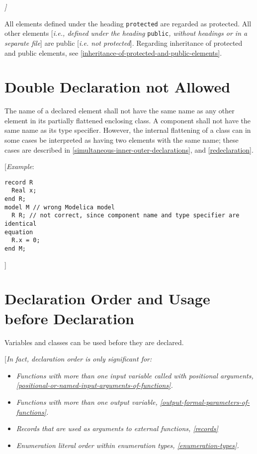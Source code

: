 \emph{{]}}

All elements defined under the heading \lstinline!protected! are regarded as
protected. All other elements {[}\emph{i.e., defined under the heading}
\lstinline!public!\emph{, without headings or in a separate file}{]} are public
{[}\emph{i.e. not protected}{]}. Regarding inheritance of protected and
public elements, see \autoref{inheritance-of-protected-and-public-elements}.

\section{Double Declaration not Allowed}

The name of a declared element shall not have the same name as any other
element in its partially flattened enclosing class. A component shall
not have the same name as its type specifier. However, the internal
flattening of a class can in some cases be interpreted as having two
elements with the same name; these cases are described in \autoref{simultaneous-inner-outer-declarations},
and \autoref{redeclaration}.

{[}\emph{Example}:
\begin{lstlisting}[language=modelica]
record R
  Real x;
end R;
model M // wrong Modelica model
  R R; // not correct, since component name and type specifier are identical
equation
  R.x = 0;
end M;
\end{lstlisting}

{]}

\section{Declaration Order and Usage before Declaration}

Variables and classes can be used before they are declared.

{[}\emph{In fact, declaration order is only significant for:}

\begin{itemize}
\item
  \emph{Functions with more than one input variable called with
  positional arguments, \autoref{positional-or-named-input-arguments-of-functions}.}
\item
  \emph{Functions with more than one output variable, \autoref{output-formal-parameters-of-functions}.}
\item
  \emph{Records that are used as arguments to external functions,
  \autoref{records}}
\item
  \emph{Enumeration literal order within enumeration types, \autoref{enumeration-types}.}
\end{itemize}

